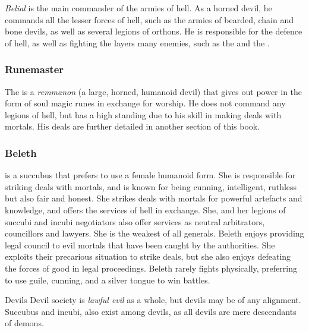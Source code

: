 \emph{Belial} is the main commander of the armies of hell. As a horned devil,
he commands all the lesser forces of hell, such as the armies of bearded,
chain and bone devils, as well as several legions of orthons. He is
responsible for the defence of hell, as well as fighting the layers many
enemies, such as the  and the .

\subsubsection{Runemaster}

The  is a \emph{remmanon} (a large, horned, humanoid
devil) that gives out power in the form of soul magic runes in exchange for
worship. He does not command any legions of hell, but has a high standing due
to his skill in making deals with mortals. His deals are further detailed in
another section of this book.

\subsubsection{Beleth}
\label{sec:Beleth}

 is a succubus that prefers to use a female
humanoid form. She is responsible for striking deals with mortals, and is
known for being cunning, intelligent, ruthless but also fair and honest. She
strikes deals with mortals for powerful artefacts and knowledge, and offers
the services of hell in exchange. She, and her legions of succubi and incubi
negotiators also offer services as neutral arbitrators, councillors and
lawyers. She is the weakest of all generals. Beleth enjoys providing legal
council to evil mortals that have been caught by the authorities. She exploits
their precarious situation to strike deals, but she also enjoys defeating
the forces of good in legal proceedings. Beleth rarely fights physically,
preferring to use guile, cunning, and a silver tongue to win battles.

\begin{35e}{Devils}
  Devil society is \emph{lawful evil} as a whole, but devils may be of any
  alignment. Succubus and incubi, also exist among devils, as all devils are
  mere descendants of demons.
\end{35e}
